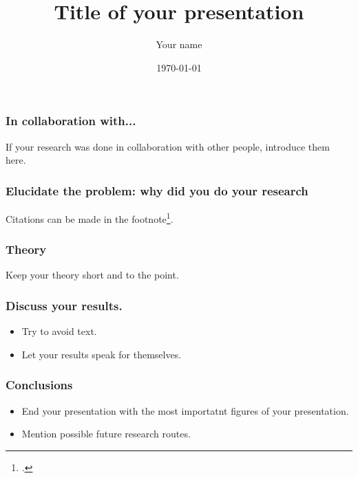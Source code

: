 \documentclass[aspectratio=169]{beamer}
\title{Title of your presentation}
\subtitle{}
\author[DB]{Your name}
\date{\today}
\begin{document}
\titleframe

\begin{frame}
\frametitle{In collaboration with...}
  If your research was done in collaboration with other people, introduce them here.
\end{frame}


\begin{frame}
  \frametitle{Elucidate the problem: why did you do your research}
  Citations can be made in the footnote\footcite{acke2020a}.
\end{frame}

\begin{frame}
\frametitle{Theory}
    Keep your theory short and to the point.
\end{frame}

\begin{frame}
\frametitle{Discuss your results.}
    \begin{itemize}
      \item Try to avoid text.
      \item Let your results speak for themselves.
    \end{itemize}
    
\end{frame}


\begin{frame}
\frametitle{Conclusions}
\begin{itemize}
  \item End your presentation with the most importatnt figures of your presentation.
  \item Mention possible future research routes.
\end{itemize}
\end{frame}
\end{document}
